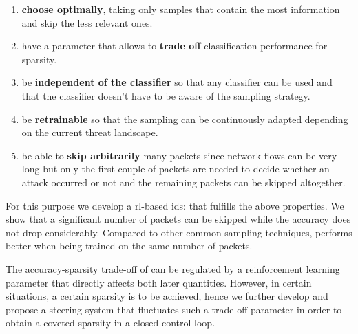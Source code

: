 \documentclass[conference]{IEEEtran}
\begin{document}
\begin{enumerate}
\item \textbf{choose optimally}, taking only samples that contain the most information and skip the less relevant ones.
\item have a parameter that allows to \textbf{trade off} classification performance for sparsity.
\item be \textbf{independent of the classifier} so that any classifier can be used and that the classifier doesn't have to be aware of the sampling strategy.
\item be \textbf{retrainable} so that the sampling can be continuously adapted depending on the current threat landscape.
\item be able to \textbf{skip arbitrarily} many packets since network flows can be very long but only the first couple of packets are needed to decide whether an attack occurred or not and the remaining packets can be skipped altogether.
\end{enumerate}



For this purpose we develop a \gls{rl}-based \gls{ids}: \textit{\ours{}} that fulfills the above properties. We show that a significant number of packets can be skipped while the accuracy does not drop
considerably. Compared to other common sampling techniques, \ours{} performs better when being trained on the same number of packets.


The accuracy-sparsity trade-off of \ours{} can be regulated by a reinforcement learning parameter that directly affects both later quantities. However, in certain situations, a certain sparsity is to be achieved, hence we further develop and propose a steering system that fluctuates such a trade-off parameter in order to obtain a coveted sparsity in a closed control loop.
\end{document}
